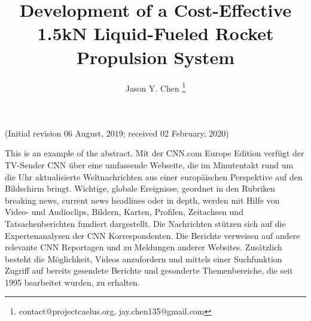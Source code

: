 \documentclass[9pt]{article} %
\title{Development of a Cost-Effective 1.5kN Liquid-Fueled Rocket Propulsion System}
\author[1]{Jason Y. Chen \footnote{contact@projectcaelus.org,  jay.chen135@gmail.com}}
\affil[1]{Founder, Project Caelus 501(c)(3)}
\date{} %
\numberwithin{equation}{section} %
\begin{document}
\maketitle
\vspace{-1cm}
\begin{center}
(Initial revision 06 August, 2019; received 02 February, 2020)
\end{center}

\begin{adjustwidth}{40pt}{40pt}
\hspace{\parindent} This is an example of the abstract. Mit der CNN.com Europe Edition verfügt der TV-Sender CNN über eine umfassende Webseite, die im Minutentakt rund um die Uhr aktualisierte Weltnachrichten aus einer europäischen Perspektive auf den Bildschirm bringt. Wichtige, globale Ereignisse, geordnet in den Rubriken breaking news, current news headlines oder in depth, werden mit Hilfe von Video- und Audioclips, Bildern, Karten, Profilen, Zeitachsen und Tatsachenberichten fundiert dargestellt. Die Nachrichten stützen sich auf die Expertenanalysen der CNN Korrespondenten. Die Berichte verweisen auf andere relevante CNN Reportagen und zu Meldungen anderer Websites. Zusätzlich besteht die Möglichkeit, Videos anzufordern und mittels einer Suchfunktion Zugriff auf bereits gesendete Berichte und gesonderte Themenbereiche, die seit 1995 bearbeitet wurden, zu erhalten.

\end{adjustwidth}
\vspace{0.4cm}
\end{document}

